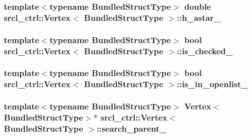 \hypertarget{classsrcl__ctrl_1_1Vertex_a83ac6cbf1e6c85477c1a4a05e1364811}{
\subsubsection[{h\-\_\-astar\-\_\-}]{\setlength{\rightskip}{0pt plus 5cm}template$<$typename Bundled\-Struct\-Type$>$ double {\bf srcl\-\_\-ctrl\-::\-Vertex}$<$ Bundled\-Struct\-Type $>$\-::h\-\_\-astar\-\_\-\hspace{0.3cm}{\ttfamily [private]}}}\label{classsrcl__ctrl_1_1Vertex_a83ac6cbf1e6c85477c1a4a05e1364811}
\hypertarget{classsrcl__ctrl_1_1Vertex_a60a360ecaa196e365fca057dedc7a7f6}{
\subsubsection[{is\-\_\-checked\-\_\-}]{\setlength{\rightskip}{0pt plus 5cm}template$<$typename Bundled\-Struct\-Type$>$ bool {\bf srcl\-\_\-ctrl\-::\-Vertex}$<$ Bundled\-Struct\-Type $>$\-::is\-\_\-checked\-\_\-\hspace{0.3cm}{\ttfamily [private]}}}\label{classsrcl__ctrl_1_1Vertex_a60a360ecaa196e365fca057dedc7a7f6}
\hypertarget{classsrcl__ctrl_1_1Vertex_a5bafa9abce6e1bd65c6aa64094206f85}{
\subsubsection[{is\-\_\-in\-\_\-openlist\-\_\-}]{\setlength{\rightskip}{0pt plus 5cm}template$<$typename Bundled\-Struct\-Type$>$ bool {\bf srcl\-\_\-ctrl\-::\-Vertex}$<$ Bundled\-Struct\-Type $>$\-::is\-\_\-in\-\_\-openlist\-\_\-\hspace{0.3cm}{\ttfamily [private]}}}\label{classsrcl__ctrl_1_1Vertex_a5bafa9abce6e1bd65c6aa64094206f85}
\hypertarget{classsrcl__ctrl_1_1Vertex_aab0a6786367f2e364b31cd1154fbdba2}{
\subsubsection[{search\-\_\-parent\-\_\-}]{\setlength{\rightskip}{0pt plus 5cm}template$<$typename Bundled\-Struct\-Type$>$ {\bf Vertex}$<$Bundled\-Struct\-Type$>$$\ast$ {\bf srcl\-\_\-ctrl\-::\-Vertex}$<$ Bundled\-Struct\-Type $>$\-::search\-\_\-parent\-\_\-\hspace{0.3cm}{\ttfamily [private]}}}\label{classsrcl__ctrl_1_1Vertex_aab0a6786367f2e364b31cd1154fbdba2}
